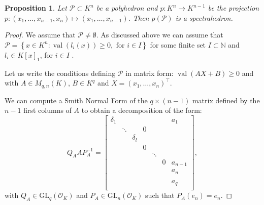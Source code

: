 \documentclass[a4paper,12pt]{article}
\newtheorem{proposition}[theorem]{Proposition}
\newcommand{\N}{\mathbb{N}} %
\newcommand{\PP}{\mathcal{P}}
\DeclareMathOperator{\val}{val}
\newcommand{\OK}{\mathcal{O}_K}
\newcommand{\GL}{\mathrm{GL}}
\begin{document}
\begin{proposition}
      Let $\PP \subset K^n$ be a polyhedron and $p : K^n \to K^{n-1}$ be the projection $p : (x_1,\dots,x_{n-1},x_n) \mapsto (x_1, \dots, x_{n-1})$.
       Then $p(\PP)$ is a spectrahedron.
\end{proposition}


\begin{proof}
      
We assume that $\PP \neq \emptyset$.
As discussed above we can assume that
  $\PP = \left\lbrace x \in K^n : \val (l_i (x) ) \geq 0,\textrm{ for } i \in I \right\rbrace$ for some
finite set $I \subset \N$ and $l_i \in K[x]_1$, for $i \in I$ .

Let us write the conditions defining $\PP$
in matrix form:
$\val(A X+B) \geq 0$ and 
with $A \in M_{q,n}(K)$, $B \in K^q$
and $X=(x_1,\dots,x_n)^\intercal$. 


We can compute a Smith Normal Form
of the $q \times (n-1)$ matrix defined by the 
$n-1$ first columns of $A$
to obtain a decomposition of the form:
\[ Q_A A P_A^{-1} = \begin{bmatrix}
\delta_1	& 		& 			&   &		 &  &a_1	\\
			& \ddots& 			& 0	&		 &	&		\\
			&		& \delta_l  &   & 		 &	&		\\
			&		&			&0  & 		 &	& 		\\
			&		&			&   & \ddots &	&		\\
			&		&			&	&		 & 0&a_{n-1} \\
			&		&			&	&		 &	&a_n 	\\
			&		&			&	&		 &	&    	\\
			&		&			&	&		 &	&a_q 	\\			
\end{bmatrix},\]
with $Q_A \in \GL_q(\OK)$ and $P_A \in \GL_n(\OK)$ such that $P_A(e_n)=e_n.$


\end{proof}
\end{document}
